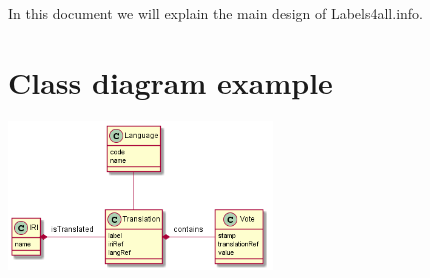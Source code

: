 \documentclass{article}
\begin{document}
In this document we will explain the main design of Labels4all.info.

\section{Class diagram example}

\begin{center}
\includegraphics[width=70mm]{classDiagram.png}
\end{center}
\end{document}
